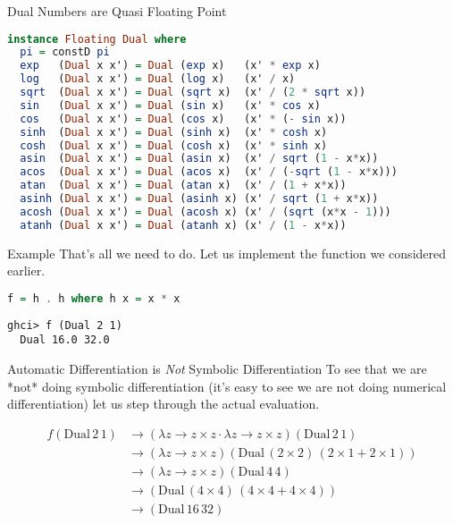 \documentclass{beamer}
\begin{document}
\begin{frame}[fragile]{Dual Numbers are Quasi Floating Point}
\begin{scriptsize}
\begin{lstlisting}[language=Haskell]
instance Floating Dual where
  pi = constD pi
  exp   (Dual x x') = Dual (exp x)   (x' * exp x)
  log   (Dual x x') = Dual (log x)   (x' / x)
  sqrt  (Dual x x') = Dual (sqrt x)  (x' / (2 * sqrt x))
  sin   (Dual x x') = Dual (sin x)   (x' * cos x)
  cos   (Dual x x') = Dual (cos x)   (x' * (- sin x))
  sinh  (Dual x x') = Dual (sinh x)  (x' * cosh x)
  cosh  (Dual x x') = Dual (cosh x)  (x' * sinh x)
  asin  (Dual x x') = Dual (asin x)  (x' / sqrt (1 - x*x))
  acos  (Dual x x') = Dual (acos x)  (x' / (-sqrt (1 - x*x)))
  atan  (Dual x x') = Dual (atan x)  (x' / (1 + x*x))
  asinh (Dual x x') = Dual (asinh x) (x' / sqrt (1 + x*x))
  acosh (Dual x x') = Dual (acosh x) (x' / (sqrt (x*x - 1)))
  atanh (Dual x x') = Dual (atanh x) (x' / (1 - x*x))
\end{lstlisting}
\end{scriptsize}
\end{frame}


\begin{frame}[fragile]{Example}
That's all we need to do. Let us implement the function we considered
earlier.

\begin{scriptsize}
\begin{lstlisting}[language=Haskell]
f = h . h where h x = x * x
\end{lstlisting}
\end{scriptsize}

\begin{scriptsize}
\begin{lstlisting}
ghci> f (Dual 2 1)
  Dual 16.0 32.0
\end{lstlisting}
\end{scriptsize}
\end{frame}

\begin{frame}[fragile]{Automatic Differentiation is {\em Not} Symbolic
    Differentiation}
To see that we are *not* doing symbolic differentiation (it's easy to
see we are not doing numerical differentiation) let us step
through the actual evaluation.

$$
\begin{aligned}
f (\mathrm{Dual}\,2\,1) &\longrightarrow (\lambda z \rightarrow z
\times z \cdot \lambda z \rightarrow z \times z) (\mathrm{Dual}\,2\,1) \\
&\longrightarrow (\lambda z \rightarrow z
\times z) (\mathrm{Dual}\,(2 \times 2)\,(2 \times 1 + 2 \times 1)) \\
&\longrightarrow  (\lambda z \rightarrow z
\times z) (\mathrm{Dual}\,4\,4)\\
&\longrightarrow (\mathrm{Dual}\,(4 \times 4)\,(4 \times 4 + 4 \times 4)) \\
&\longrightarrow (\mathrm{Dual}\,16\,32)\\
\end{aligned}
$$
\end{frame}
\end{document}
